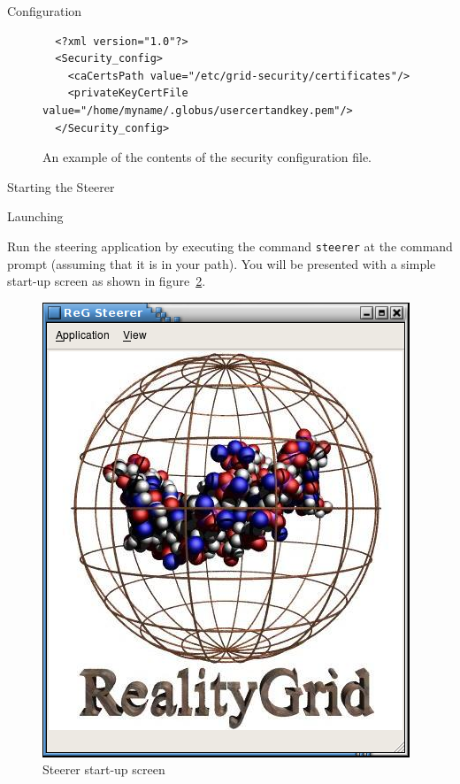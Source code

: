 \documentclass[a4paper,twoside]{article}
\begin{document}
\begin{section}{Configuration}
\begin{figure}
\begin{verbatim}
  <?xml version="1.0"?>
  <Security_config>
    <caCertsPath value="/etc/grid-security/certificates"/>
    <privateKeyCertFile value="/home/myname/.globus/usercertandkey.pem"/>
  </Security_config>
\end{verbatim}
\caption{An example of the contents of the security configuration file.}
\label{fig:security_conf}
\end{figure}

\end{section}


\begin{section}{Starting the Steerer}

\begin{subsection}{Launching}

Run the steering application by executing the command \texttt{steerer}
at the command prompt (assuming that it is in your path). You will be
presented with a simple start-up screen as shown in
figure~\ref{fig:startup_screen}.


\begin{figure}
\centerline{\includegraphics{startup_screen.png}}
\caption{Steerer start-up screen}
\label{fig:startup_screen}
\end{figure}


\end{subsection}
\end{section}
\end{document}
